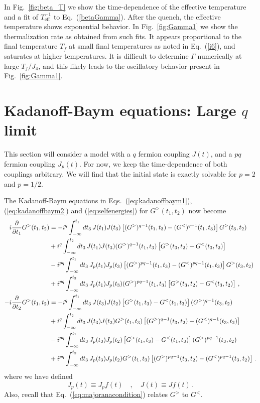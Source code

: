 \documentclass[prx,aps,onecolumn,amsfonts,showpacs,superscriptaddress,preprint,eqsecnum]
{revtex4-1}
\newcommand{\beq}{\begin{equation}}
\newcommand{\eeq}{\end{equation}}
\begin{document}
In Fig.~\ref{fig:beta_T} we show the time-dependence of the effective temperature and a fit of $T_\text{eff}^{-1}$ to Eq.~(\ref{betaGamma}).
After the quench, the effective temperature shows exponential behavior. In Fig.~\ref{fig:Gamma1} we show the thermalization rate as obtained from such fits. It appears proportional to the final temperature $T_f$ at small final temperatures as noted in Eq.~(\ref{i6}), and saturates at higher temperatures. It is difficult to determine $\Gamma$ numerically at large $T_f/J_4$, and this likely leads to the oscillatory behavior present in Fig.~\ref{fig:Gamma1}.

\section{Kadanoff-Baym equations: Large $q$ limit}
\label{sec:largeq}

This section will
consider a model with a $q$ fermion coupling $J (t)$, and a $pq$ fermion coupling $J_p(t)$. For now, we keep the time-dependence of both
couplings arbitrary. We will find that the initial state is exactly solvable for $p=2$ and $p=1/2$.

The Kadanoff-Baym equations in Eqs.~(\ref{eq:kadanoffbaym1}), (\ref{eq:kadanoffbaym2}) and (\ref{eq:selfenergies})
for $G^> (t_1, t_2)$ now become
\begin{align}
i \frac{\partial}{\partial t_1} G^>(t_1,t_2) &= - i^q \int_{-\infty}^{t_1} dt_3 \, J(t_1) J(t_3) \left[ (G^>)^{q-1} (t_1,t_3) -(G^<)^{q-1} (t_1,t_3) \right] G^{>}(t_3, t_2)  \notag \\
&+  i^q \int_{-\infty}^{t_2} dt_3 \, J(t_1) J(t_3) (G^>)^{q-1} (t_1,t_3) 
\left[ G^>(t_3,t_2) -G^<(t_3,t_2) \right]   \notag \\
& - i^{pq} \int_{-\infty}^{t_1} dt_3 \, J_p (t_1) J_p (t_3) \left[ (G^>)^{pq-1} (t_1,t_3) -(G^<)^{pq-1} (t_1,t_3) \right] G^{>}(t_3, t_2)  \notag \\
&+  i^{pq} \int_{-\infty}^{t_2} dt_3 \, J_p (t_1) J_p (t_3) (G^>)^{pq-1} (t_1,t_3) 
\left[ G^>(t_3,t_2) -G^<(t_3,t_2) \right] \, ,  \notag \\
-i \frac{\partial}{ \partial t_2} G^>(t_1,t_2) &= - i^q \int_{-\infty}^{t_1} dt_3 \, J(t_3) J(t_2) \left[ G^>(t_1,t_3) - G^<(t_1,t_3) \right] (G^{>})^{q-1} (t_3,t_2)  \notag \\
&+ i^q \int_{-\infty}^{t_2} dt_3 \, J(t_3) J(t_2) G^>(t_1,t_3) \left[ (G^>)^{q-1} (t_3,t_2) -(G^<)^{q-1} (t_3,t_2) \right]
\notag \\
& - i^{pq} \int_{-\infty}^{t_1} dt_3 \, J_p(t_3) J_p(t_2) \left[ G^>(t_1,t_3) - G^<(t_1,t_3) \right] (G^{>})^{pq-1} (t_3,t_2)  \label{e1} \\
&+ i^{pq} \int_{-\infty}^{t_2} dt_3 \, J_p(t_3) J_p(t_2) G^>(t_1,t_3) \left[ (G^>)^{pq-1} (t_3,t_2) -(G^<)^{pq-1} (t_3,t_2) \right]
\,. \notag
\end{align}
where we have defined
\beq
J_p (t) \equiv J_p f(t) \quad , \quad J(t) \equiv J f(t)\,.
\eeq 
Also, recall that Eq.~(\ref{eq:majoranacondition}) relates $G^>$ to
$G^<$.
\end{document}
